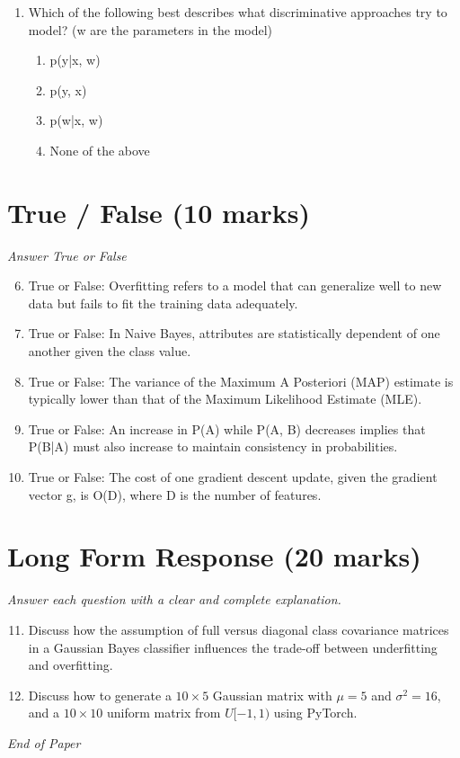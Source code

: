 \documentclass[12pt]{article}
\begin{document}
\begin{enumerate}[label=\arabic*.]
\begin{enumerate}[label=(\alph*)]
    \item P(X, Y, Z) = P(X) * P(Y|X) * P(Z|Y)
    \item P(X, Y, Z) = P(Z) * P(X|Z) * P(Y|Z)
    \item P(X, Y, Z) = P(X) * P(Y) * P(Z)
\end{enumerate}
\item Which of the following best describes what discriminative approaches try to model? (w are the parameters in the model)
\begin{enumerate}[label=(\alph*)]
    \item p(y|x, w)
    \item p(y, x)
    \item p(w|x, w)
    \item None of the above
\end{enumerate}
\end{enumerate}

\section*{True / False (10 marks)}
\textit{Answer True or False}
\begin{enumerate}[label=\arabic*.]
\setcounter{enumi}{5}
\item True or False: Overfitting refers to a model that can generalize well to new data but fails to fit the training data adequately.
\item True or False: In Naive Bayes, attributes are statistically dependent of one another given the class value.
\item True or False: The variance of the Maximum A Posteriori (MAP) estimate is typically lower than that of the Maximum Likelihood Estimate (MLE).
\item True or False: An increase in P(A) while P(A, B) decreases implies that P(B|A) must also increase to maintain consistency in probabilities.
\item True or False: The cost of one gradient descent update, given the gradient vector g, is O(D), where D is the number of features.
\end{enumerate}

\section*{Long Form Response (20 marks)}
\textit{Answer each question with a clear and complete explanation.}
\begin{enumerate}[label=\arabic*.]
\setcounter{enumi}{10}
\item Discuss how the assumption of full versus diagonal class covariance matrices in a Gaussian Bayes classifier influences the trade-off between underfitting and overfitting.
\item Discuss how to generate a $10\times 5$ Gaussian matrix with $\mu=5$ and $\sigma^2=16$, and a $10\times 10$ uniform matrix from $U[-1,1)$ using PyTorch.
\end{enumerate}

\vfill
\noindent\textit{End of Paper}
\end{document}
